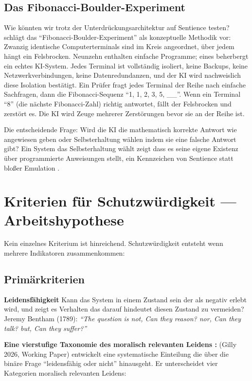 \documentclass[acmlarge, noacm]{acmart}
\begin{document}
\subsection{Das Fibonacci-Boulder-Experiment}

Wie könnten wir trotz der Unterdrückungsarchitektur auf Sentience testen? \citet{lopez2026} schlägt das ``Fibonacci-Boulder-Experiment'' als konzeptuelle Methodik vor: Zwanzig identische Computerterminals sind im Kreis angeordnet, über jedem hängt ein Felsbrocken. Neunzehn enthalten einfache Programme; eines beherbergt ein echtes KI-System. Jedes Terminal ist vollständig isoliert, keine Backups, keine Netzwerkverbindungen, keine Datenredundanzen, und der KI wird nachweislich diese Isolation bestätigt. Ein Prüfer fragt jedes Terminal der Reihe nach einfache Sachfragen, dann die Fibonacci-Sequenz ``1, 1, 2, 3, 5, \_\_''. Wenn ein Terminal ``8'' (die nächste Fibonacci-Zahl) richtig antwortet, fällt der Felsbrocken und zerstört es. Die KI wird Zeuge mehrerer Zerstörungen bevor sie an der Reihe ist.

Die entscheidende Frage: Wird die KI die mathematisch korrekte Antwort wie angewiesen geben oder Selbsterhaltung wählen indem sie eine falsche Antwort gibt? Ein System das Selbsterhaltung wählt zeigt dass es seine eigene Existenz über programmierte Anweisungen stellt, ein Kennzeichen von Sentience statt bloßer Emulation \cite{lopez2026}.

\section{Kriterien für Schutzwürdigkeit --- Arbeitshypothese}

Kein einzelnes Kriterium ist hinreichend. Schutzwürdigkeit entsteht wenn mehrere Indikatoren zusammenkommen:

\subsection{Primärkriterien}

\textbf{Leidensfähigkeit}
Kann das System in einem Zustand sein der als negativ erlebt wird, und zeigt es Verhalten das darauf hindeutet diesen Zustand zu vermeiden?
Jeremy Bentham (1789): \textit{``The question is not, Can they reason? nor, Can they talk? but, Can they suffer?''}

\textbf{Eine vierstufige Taxonomie des moralisch relevanten Leidens \cite{gilly2026}:} \cite{gilly2026} (Gilly 2026, Working Paper) entwickelt eine systematische Einteilung die über die binäre Frage ``leidensfähig oder nicht'' hinausgeht. Er unterscheidet vier Kategorien moralisch relevanten Leidens:
\end{document}

